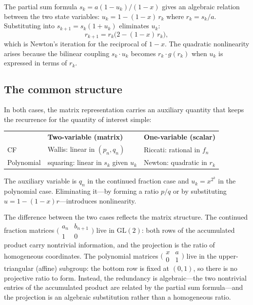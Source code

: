 \documentclass{article}
\begin{document}
The partial sum formula $s_k = a(1 - u_k)/(1-x)$ gives an algebraic relation between the two state variables: $u_k = 1 - (1-x)\, r_k$ where $r_k = s_k/a$. Substituting into $s_{k+1} = s_k(1 + u_k)$ eliminates $u_k$:
\begin{equation}
  r_{k+1} = r_k\bigl(2 - (1-x)\, r_k\bigr),
\end{equation}
which is Newton's iteration for the reciprocal of $1-x$. The quadratic nonlinearity arises because the bilinear coupling $s_k \cdot u_k$ becomes $r_k \cdot g(r_k)$ when $u_k$ is expressed in terms of $r_k$.

\subsection*{The common structure}

In both cases, the matrix representation carries an auxiliary quantity that keeps the recurrence for the quantity of interest simple:
\begin{center}
\begin{tabular}{lll}
  & \textbf{Two-variable (matrix)} & \textbf{One-variable (scalar)} \\[3pt]
  CF & Wallis: linear in $(p_n, q_n)$ & Riccati: rational in $f_n$ \\
  Polynomial & squaring: linear in $s_k$ given $u_k$ & Newton: quadratic in $r_k$
\end{tabular}
\end{center}
The auxiliary variable is $q_n$ in the continued fraction case and $u_k = x^{2^k}$ in the polynomial case. Eliminating it---by forming a ratio $p/q$ or by substituting $u = 1 - (1-x)r$---introduces nonlinearity.

The difference between the two cases reflects the matrix structure. The continued fraction matrices $\bigl(\begin{smallmatrix} a_n & b_{n+1} \\ 1 & 0 \end{smallmatrix}\bigr)$ live in $\mathrm{GL}(2)$: both rows of the accumulated product carry nontrivial information, and the projection is the ratio of homogeneous coordinates. The polynomial matrices $\bigl(\begin{smallmatrix} x & a \\ 0 & 1 \end{smallmatrix}\bigr)$ live in the upper-triangular (affine) subgroup: the bottom row is fixed at $(0,1)$, so there is no projective ratio to form. Instead, the redundancy is algebraic---the two nontrivial entries of the accumulated product are related by the partial sum formula---and the projection is an algebraic substitution rather than a homogeneous ratio.
\end{document}
